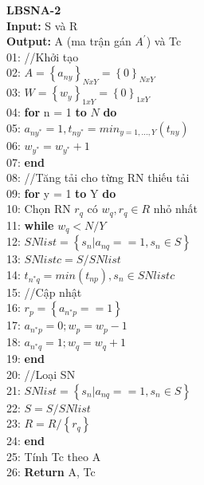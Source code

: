 \documentclass[hidelinks, 11pt, a4paper]{report}
\newenvironment{codeb}{\code}{\par}
\begin{document}
\textbf{LBSNA-2}\\
\begin{codeb}
    \textbf{Input:} S và R\\
    \textbf{Output:} A (ma trận gán $A^{'}$) và Tc\\
    01: //Khởi tạo\\
    02: $A = \left\{a_{ny}\right\}_{NxY} = \left\{0\right\}_{NxY}$\\
    03: $W = \left\{w_{y}\right\}_{1xY} = \left\{0\right\}_{1xY}$\\
    04: \textbf{for} n = 1 \textbf{to} $N$ \textbf{do}\\
    05: \hspace{2mm}$a_{ny^*} = 1, t_{ny^*} = min_{y=1,...,Y}(t_{ny})$\\
    06: \hspace{2mm}$w_{y^*} = w_{y^*} + 1$\\
    07: \textbf{end}\\
    08: //Tăng tải cho từng RN thiếu tải\\
    09: \textbf{for} y = 1 \textbf{to} Y \textbf{do}\\
    10: \hspace{2mm}Chọn RN $r_q$ có $w_q, r_q \in R$ nhỏ nhất\\
    11: \hspace{2mm}\textbf{while} $w_q < N/Y$\\
    12: \hspace{4mm}$SNlist = \left\{s_n | a_{nq} == 1, s_n \in S\right\}$\\
    13: \hspace{4mm}$SNlistc = S/SNlist$\\
    14: \hspace{4mm}$t_{n^*q} = min(t_{np}), s_n \in SNlistc$\\
    15: \hspace{4mm}//Cập nhật\\
    16: \hspace{4mm}$r_p = \left\{a_{n^*p} == 1\right\}$\\
    17: \hspace{4mm}$a_{n^*p} = 0; w_p = w_p - 1$\\
    18: \hspace{4mm}$a_{n^*q} = 1; w_{q} = w_{q} + 1$\\
    19: \hspace{2mm}\textbf{end}\\
    20: \hspace{2mm}//Loại SN\\
    21: \hspace{2mm}$SNlist = \left\{s_n | a_{nq} == 1, s_n \in S\right\}$\\
    22: \hspace{2mm}$S = S/SNlist$\\
    23: \hspace{2mm}$R = R/\left\{r_q\right\}$\\
    24: \textbf{end}\\
    25: Tính Tc theo A\\
    26: \textbf{Return} A, Tc\\
\end{codeb}
\end{document}
